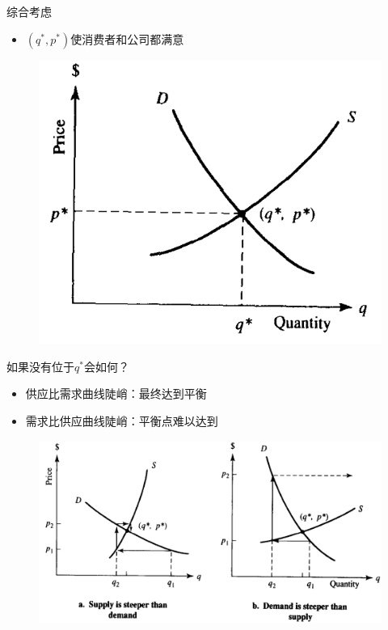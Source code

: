 \documentclass[mathserif, table]{beamer}
\begin{document}
\begin{frame}{综合考虑}
  \begin{itemize}
  \item $(q^*, p^*)$使消费者和公司都满意
  \end{itemize}

  \begin{figure}
    \centering
    \includegraphics[width=.5\textwidth]{both.png}
  \end{figure}
  
\end{frame}

\begin{frame}{如果没有位于$q^*$会如何？}
  \begin{itemize}
  \item 供应比需求曲线陡峭：最终达到平衡
  \item 需求比供应曲线陡峭：平衡点难以达到
  \end{itemize}

  \begin{figure}
    \centering
    \includegraphics[width=.7\textwidth]{sd.png}
  \end{figure}

\end{frame}
\end{document}
